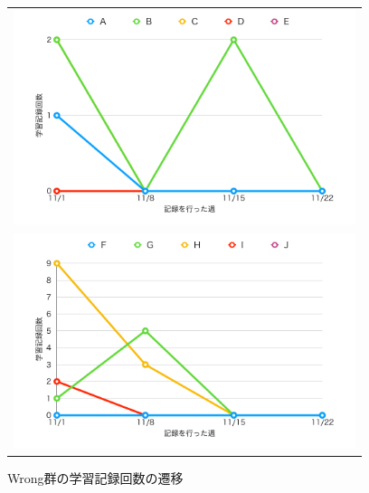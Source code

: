 \begin{figure}[htb]
\begin{center}
\begin{tabular}{c}

  \begin{minipage}[htb]{\linewidth}
  \begin{center}
  \includegraphics[width=10cm]{images/7/same_study_count.png}
  \caption{Same群の学習記録回数の遷移}
  \label{fig:same_study_count}
  \end{center}
  \end{minipage}

  \\

  \begin{minipage}[htb]{\linewidth}
  \begin{center}
  \includegraphics[width=10cm]{images/7/wrong_study_count.png}
  \caption{Wrong群の学習記録回数の遷移}
  \label{fig:wrong_study_count}
  \end{center}
  \end{minipage}

  \\


\end{tabular}
\end{center}
\end{figure}
